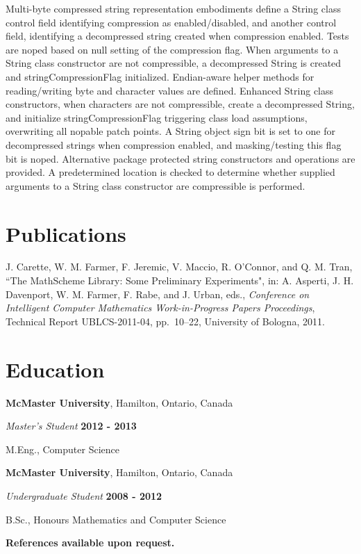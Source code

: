 \documentclass[margin,line]{res}
\begin{document}
\begin{resume}
\begin{list}{}{\leftmargin=0cm}
Multi-byte compressed string representation embodiments define a String class control field identifying compression as
enabled/disabled, and another control field, identifying a decompressed string created when compression enabled. Tests
are noped based on null setting of the compression flag. When arguments to a String class constructor are not
compressible, a decompressed String is created and stringCompressionFlag initialized. Endian-aware helper methods for
reading/writing byte and character values are defined. Enhanced String class constructors, when characters are not
compressible, create a decompressed String, and initialize stringCompressionFlag triggering class load assumptions,
overwriting all nopable patch points. A String object sign bit is set to one for decompressed strings when compression
enabled, and masking/testing this flag bit is noped. Alternative package protected string constructors and operations
are provided. A predetermined location is checked to determine whether supplied arguments to a String class constructor
are compressible is performed.
\end{list}

\section{\sc Publications}

J. Carette, W. M. Farmer, F. Jeremic, V. Maccio, R. O'Connor, and Q. M. Tran, ``The MathScheme Library: Some
Preliminary Experiments", in: A. Asperti, J. H. Davenport, W. M. Farmer, F. Rabe, and J. Urban, eds.,
\emph{Conference on Intelligent Computer Mathematics Work-in-Progress Papers Proceedings}, Technical Report
UBLCS-2011-04, pp.~10--22, University of Bologna, 2011.

\section{\sc Education}

{\bf McMaster University}, Hamilton, Ontario, Canada

\vspace{-.3cm}

{\em Master's Student} \hfill {\bf 2012 - 2013}

\vspace{-.4cm}

M.Eng., Computer Science

{\bf McMaster University}, Hamilton, Ontario, Canada

\vspace{-.3cm}

{\em Undergraduate Student} \hfill {\bf 2008 - 2012}

\vspace{-.4cm}

B.Sc., Honours Mathematics and Computer Science

\begin{center}
\textbf{References available upon request.}
\end{center}

\end{resume}
\end{document}
